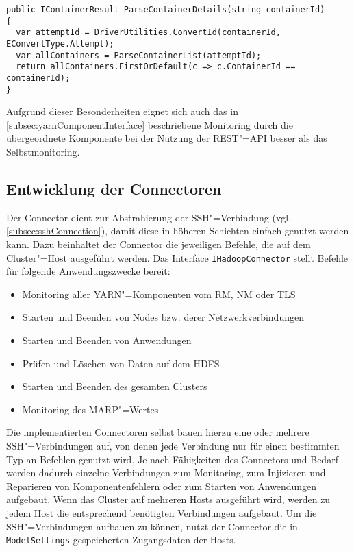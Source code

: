 \begin{lstlisting}[label=lst:restParseDetails,style=cs,
caption={[Konvertierung und Rückgabe der Daten durch den RestParser]
    Konvertierung und Rückgabe der Daten eines durch den \texttt{RestParser}.
    Hierbei muss für den hier gezeigten, einzelnen Container zunächst ID des übergeordneten Attempts ermittelt werden, bevor aus der Liste aller Container die Daten des gesuchten Containers zurückgegeben werden können.
    Bei Attempts ist dieses Vorgehen analog.}]
public IContainerResult ParseContainerDetails(string containerId)
{
  var attemptId = DriverUtilities.ConvertId(containerId, EConvertType.Attempt);
  var allContainers = ParseContainerList(attemptId);
  return allContainers.FirstOrDefault(c => c.ContainerId == containerId);
}
\end{lstlisting}

Aufgrund dieser Besonderheiten eignet sich auch das in \cref{subsec:yarnComponentInterface} beschriebene Monitoring durch die übergeordnete Komponente bei der Nutzung der REST"=API besser als das Selbstmonitoring.

\subsection{Entwicklung der Connectoren}
\label{subsec:implementedConnectors}

Der Connector dient zur Abstrahierung der SSH"=Verbindung (vgl. \cref{subsec:sshConnection}), damit diese in höheren Schichten einfach genutzt werden kann.
Dazu beinhaltet der Connector die jeweiligen Befehle, die auf dem Cluster"=Host ausgeführt werden.
Das Interface \texttt{IHadoopConnector} stellt Befehle für folgende Anwendungszwecke bereit:

\begin{itemize}
    \item Monitoring aller YARN"=Komponenten vom \ac{RM}, \ac{NM} oder \ac{TLS}
    \item Starten und Beenden von Nodes bzw. derer Netzwerkverbindungen
    \item Starten und Beenden von Anwendungen
    \item Prüfen und Löschen von Daten auf dem \ac{HDFS}
    \item Starten und Beenden des gesamten Clusters
    \item Monitoring des \ac{MARP}"=Wertes
\end{itemize}

Die implementierten Connectoren selbst bauen hierzu eine oder mehrere SSH"=Verbindungen auf, von denen jede Verbindung nur für einen bestimmten Typ an Befehlen genutzt wird.
Je nach Fähigkeiten des Connectors und Bedarf werden dadurch einzelne Verbindungen zum Monitoring, zum Injizieren und Reparieren von Komponentenfehlern oder zum Starten von Anwendungen aufgebaut.
Wenn das Cluster auf mehreren Hosts ausgeführt wird, werden zu jedem Host die entsprechend benötigten Verbindungen aufgebaut.
Um die SSH"=Verbindungen aufbauen zu können, nutzt der Connector die in \texttt{ModelSettings} gespeicherten Zugangsdaten der Hosts.

